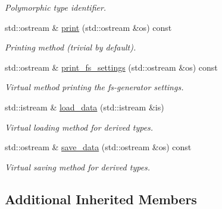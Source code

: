 \begin{DoxyCompactItemize}
\begin{DoxyCompactList}\small\item\em Polymorphic type identifier. \end{DoxyCompactList}\item 
\hypertarget{a00447_aa8997d96d03bd047551a20aee60ece34}{std\-::ostream \& \hyperlink{a00447_aa8997d96d03bd047551a20aee60ece34}{print} (std\-::ostream \&os) const }\label{a00447_aa8997d96d03bd047551a20aee60ece34}

\begin{DoxyCompactList}\small\item\em Printing method (trivial by default). \end{DoxyCompactList}\item 
\hypertarget{a00447_a969397598085e05b2b276221f02623b3}{std\-::ostream \& \hyperlink{a00447_a969397598085e05b2b276221f02623b3}{print\-\_\-fs\-\_\-settings} (std\-::ostream \&os) const }\label{a00447_a969397598085e05b2b276221f02623b3}

\begin{DoxyCompactList}\small\item\em Virtual method printing the fs-\/generator settings. \end{DoxyCompactList}\item 
\hypertarget{a00447_a1ca5db4566cf09d09058d7eece51d3ee}{std\-::istream \& \hyperlink{a00447_a1ca5db4566cf09d09058d7eece51d3ee}{load\-\_\-data} (std\-::istream \&is)}\label{a00447_a1ca5db4566cf09d09058d7eece51d3ee}

\begin{DoxyCompactList}\small\item\em Virtual loading method for derived types. \end{DoxyCompactList}\item 
\hypertarget{a00447_a0070c5ed59636469596bb3ed1fdc026d}{std\-::ostream \& \hyperlink{a00447_a0070c5ed59636469596bb3ed1fdc026d}{save\-\_\-data} (std\-::ostream \&os) const }\label{a00447_a0070c5ed59636469596bb3ed1fdc026d}

\begin{DoxyCompactList}\small\item\em Virtual saving method for derived types. \end{DoxyCompactList}\end{DoxyCompactItemize}
\subsection*{Additional Inherited Members}


